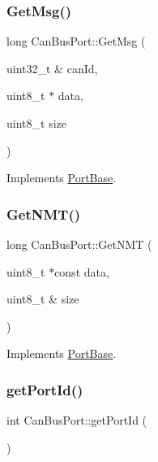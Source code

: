 \subsubsection{\texorpdfstring{Get\+Msg()}{GetMsg()}}
{\footnotesize\ttfamily long Can\+Bus\+Port\+::\+Get\+Msg (\begin{DoxyParamCaption}\item[{uint32\+\_\+t \&}]{can\+Id,  }\item[{uint8\+\_\+t $\ast$}]{data,  }\item[{uint8\+\_\+t}]{size }\end{DoxyParamCaption})\hspace{0.3cm}{\ttfamily [virtual]}}



Implements \hyperlink{classPortBase_a57e891d3992f70dea5c5e403350088be}{Port\+Base}.

\mbox{\label{classCanBusPort_a41242dc7980ca398e4770813e50ef32b}} 
\subsubsection{\texorpdfstring{Get\+N\+M\+T()}{GetNMT()}}
{\footnotesize\ttfamily long Can\+Bus\+Port\+::\+Get\+N\+MT (\begin{DoxyParamCaption}\item[{uint8\+\_\+t $\ast$const}]{data,  }\item[{uint8\+\_\+t \&}]{size }\end{DoxyParamCaption})\hspace{0.3cm}{\ttfamily [virtual]}}



Implements \hyperlink{classPortBase_abab2bf17b01d87c2bca01cb2151aa2f1}{Port\+Base}.

\mbox{\label{classCanBusPort_a7c6b733c5834d4ab3e1906d847a2234a}} 
\subsubsection{\texorpdfstring{get\+Port\+Id()}{getPortId()}}
{\footnotesize\ttfamily int Can\+Bus\+Port\+::get\+Port\+Id (\begin{DoxyParamCaption}{ }\end{DoxyParamCaption})}

